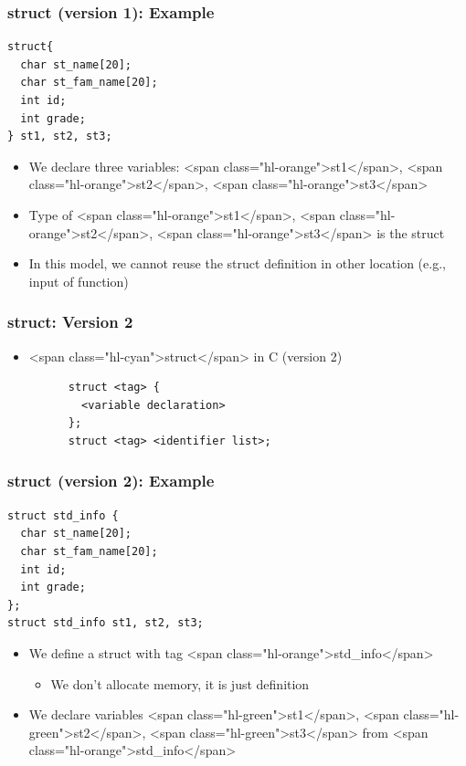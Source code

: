 \documentclass{../c-lecture}
\begin{document}
\begin{frame}[fragile]
  \frametitle{struct (version 1): Example}
  \begin{verbatim}
struct{
  char st_name[20];
  char st_fam_name[20];
  int id;
  int grade;
} st1, st2, st3;
  \end{verbatim}
  \begin{itemize}
    \item
      We declare three variables: <span class="hl-orange">st1</span>,
      <span class="hl-orange">st2</span>,
      <span class="hl-orange">st3</span>

    \item
      Type of <span class="hl-orange">st1</span>,
      <span class="hl-orange">st2</span>, <span class="hl-orange">st3</span> is
      the struct

    \item
      In this model, we cannot reuse the struct definition in other location
      (e.g., input of function)

  \end{itemize}
\end{frame}

\begin{frame}[fragile]
  \frametitle{struct: Version 2}
  \begin{itemize}
    \item <span class="hl-cyan">struct</span> in C (version 2)
    \begin{verbatim}
      struct <tag> {
        <variable declaration>
      };
      struct <tag> <identifier list>;
    \end{verbatim}
  \end{itemize}
\end{frame}

\begin{frame}[fragile]
  \frametitle{struct (version 2): Example}
  \begin{verbatim}
struct std_info {
  char st_name[20];
  char st_fam_name[20];
  int id;
  int grade;
};
struct std_info st1, st2, st3;
  \end{verbatim}
  \begin{itemize}
    \item We define a struct with tag <span class="hl-orange">std\_info</span>
    \begin{itemize}
      \item We don’t allocate memory, it is just definition
    \end{itemize}
    \item
      We declare variables <span class="hl-green">st1</span>,
      <span class="hl-green">st2</span>, <span class="hl-green">st3</span> from
      <span class="hl-orange">std\_info</span>
  \end{itemize}
\end{frame}
\end{document}
